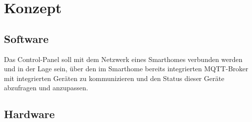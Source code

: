 \chapter{Konzept}
    \section{Software}
        Das Control-Panel soll mit dem Netzwerk eines Smarthomes
        verbunden werden und in der Lage sein, über den im Smarthome 
        bereits integrierten MQTT-Broker mit integrierten Geräten zu 
        kommunizieren und den Status dieser Geräte abzufragen und anzupassen.


    \section{Hardware}
        
        
        